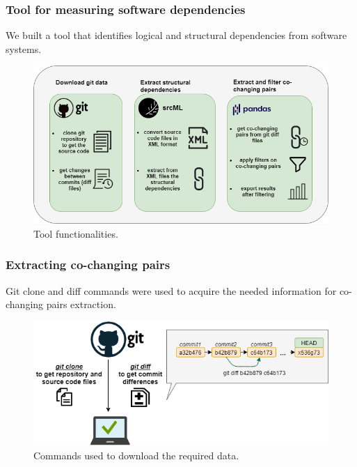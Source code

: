 \documentclass{beamer}
\begin{document}
 \begin{frame}
\frametitle{Tool for measuring software dependencies}
We built a tool that identifies logical and structural dependencies from software systems.
\begin{center}
     \begin{figure}
	\includegraphics[width=\textwidth]{tool_workflow.png}
	\caption{\label{fig:fig1}Tool functionalities.}
     \end{figure}
\end{center}
\end{frame}


 \begin{frame}
\frametitle{Extracting co-changing pairs}
Git clone and diff commands were used to acquire the needed information for co-changing pairs extraction.
\begin{center}
     \begin{figure}
	\includegraphics[width=\textwidth]{gitdata.png}
	\caption{\label{fig:fig1} Commands used to download the required data.}
     \end{figure}
\end{center}
\end{frame}
\end{document}

